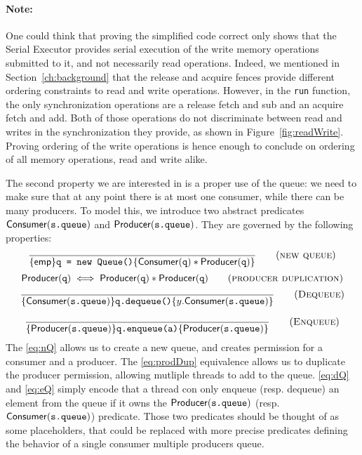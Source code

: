 \paragraph{Note:} One could think that proving the simplified code correct only shows that the Serial Executor provides serial execution of the write memory operations submitted to it, and not necessarily read operations. Indeed, we mentioned in Section~\ref{ch:background} that the release and acquire fences provide different ordering constraints to read and write operations. However, in the \texttt{run} function, the only synchronization operations are a release fetch and sub and an acquire fetch and add. Both of those operations do not discriminate between read and writes in the synchronization they provide, as shown in Figure~\ref{fig:readWrite}. Proving ordering of the write operations is hence enough to conclude on ordering of all memory operations, read and write alike.

The second property we are interested in is a proper use of the queue: we need to make sure that at any point there is at most one consumer, while there can be many producers. To model this, we introduce two abstract predicates $\mathsf{Consumer}(\texttt{s.queue})$ and $\mathsf{Producer}(\texttt{s.queue})$. They are governed by the following properties:
\begin{equation}
		\frac{}{\{\mathsf{emp}\} \texttt{q = new Queue()} \{\mathsf{Consumer}(\texttt{q}) * \mathsf{Producer}(\texttt{q})\}} 
		\tag{\textsc{new queue}} 
		\label{eq:nQ}
\end{equation}
\begin{equation}
		\mathsf{Producer}(\texttt{q}) \iff \mathsf{Producer}(\texttt{q}) * \mathsf{Producer}(\texttt{q})
		\tag{\textsc{producer duplication}} 
		\label{eq:prodDup}
\end{equation}
\begin{equation}
		\frac{}{\{\mathsf{\consQ}\} \texttt{q.dequeue()} \{y.\consQ\}} 
\tag{\textsc{Dequeue}} 
\label{eq:dQ}
\end{equation}

\begin{equation}
		\frac{}{\{\mathsf{\prodQ}\} \texttt{q.enqueue(a)} \{\prodQ\}} 
\tag{\textsc{Enqueue}} 
\label{eq:eQ}
\end{equation}
The \eqref{eq:nQ} allows us to create a new queue, and creates permission for a consumer and a producer. The \eqref{eq:prodDup} equivalence allows us to duplicate the producer permission, allowing mutliple threads to add to the queue. \eqref{eq:dQ} and \eqref{eq:eQ} simply encode that a thread con only enqueue (resp. dequeue) an element from the queue if it owns the $\mathsf{Producer}(\texttt{s.queue})$ (resp. $\mathsf{Consumer}(\texttt{s.queue})$) predicate. Those two predicates should be thought of as some placeholders, that could be replaced with more precise predicates defining the behavior of a single consumer multiple producers queue.

